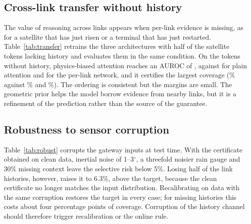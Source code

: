 

\subsection{Cross-link transfer without history}
The value of reasoning across links appears when per-link evidence is missing, as for a satellite that has just risen or a terminal that has just restarted. Table~\ref{tab:transfer} retrains the three architectures with half of the satellite tokens lacking history and evaluates them in the same condition. On the tokens without history, physics-biased attention reaches an AUROC of \RTrPBAMiss, against \RTrATTMiss{} for plain attention and \RTrMLPMiss{} for the per-link network, and it certifies the largest coverage (\RTrPBACov\% against \RTrATTCov\% and \RTrMLPCov\%). The ordering is consistent but the margins are small. The geometric prior helps the model borrow evidence from nearby links, but it is a refinement of the prediction rather than the source of the guarantee.



\subsection{Robustness to sensor corruption}
Table~\ref{tab:robust} corrupts the gateway inputs at test time. With the certificate obtained on clean data, inertial noise of 1--3$^\circ$, a threefold noisier rain gauge and 30\% missing context leave the selective risk below 5\%. Losing half of the link histories, however, raises it to 6.3\%, above the target, because the clean certificate no longer matches the input distribution. Recalibrating on data with the same corruption restores the target in every case; for missing histories this costs about four percentage points of coverage. Corruption of the history channel should therefore trigger recalibration or the online rule.



